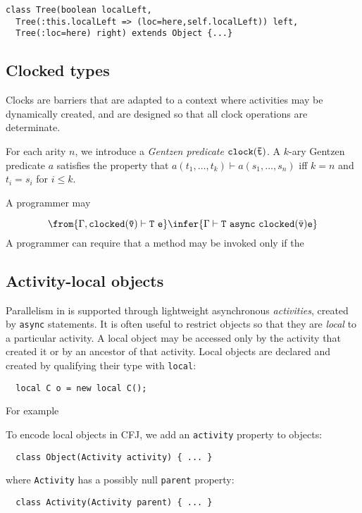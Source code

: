 {\footnotesize
\begin{verbatim}
class Tree(boolean localLeft,
  Tree(:this.localLeft => (loc=here,self.localLeft)) left, 
  Tree(:loc=here) right) extends Object {...}
\end{verbatim}}

\subsection{Clocked types}

Clocks are barriers that are adapted to a context where activities may be
dynamically created, and are designed so that all clock operations are
determinate.

For each arity $n$, we introduce a {\em Gentzen predicate} ${\tt
clock(\bar{t})}$. A $k$-ary Gentzen predicate $a$ satisfies the
property that $a(t_1,\ldots, t_k) \vdash a(s_1,\ldots,s_n)$ iff $k=n$
and $t_i=s_i$ for $i\leq k$.

A programmer may

$$
\from{\Gamma, {\tt clocked(\bar{\tt v})} \vdash {\tt T}\ {\tt e}}
\infer{\Gamma \vdash {\tt T}\ {\tt async}\ {\tt clocked}(\bar{\tt v}) {\tt e}}
$$
A programmer can require that a method may be invoked only if the 



\subsection{Activity-local objects}

Parallelism in \Xten{} is supported through lightweight asynchronous {\em
activities}, created by {\tt async} statements.
It is often useful to restrict objects so that they are {\em local} to a
particular activity.
A local object may be accessed only by
the activity that created it or by an ancestor of that activity.
Local objects are declared and created by qualifying their type
with {\tt local}:
\begin{verbatim}
  local C o = new local C();
\end{verbatim}
For example

To encode local objects in CFJ, we add an {\tt activity} property to objects:
\begin{verbatim}
  class Object(Activity activity) { ... }
\end{verbatim}
\noindent
where {\tt Activity} has a possibly null {\tt parent} property:
\begin{verbatim}
  class Activity(Activity parent) { ... }
\end{verbatim}
\noindent

